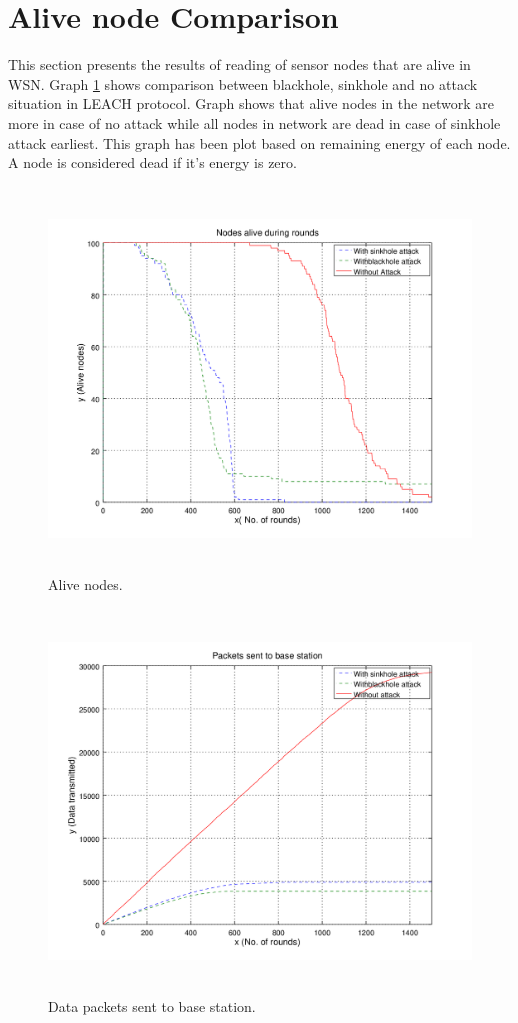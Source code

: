 \section{Alive node Comparison}
This section presents the results of reading of sensor nodes that are alive in WSN. Graph \ref{alive} shows comparison between blackhole, sinkhole and no attack situation in LEACH protocol. Graph shows that alive nodes in the network are more in case of no attack while all nodes in network are dead in case of sinkhole attack earliest. This graph has been plot based on remaining energy of each node. A node is considered dead if it's energy is zero.
    \begin{figure}[tp]
     \centering
     \includegraphics[width=5.5in, height=4in] {Figures/PNG/alive.png}
     \caption{Alive nodes.}
     \label{alive}
    \end{figure}

    \begin{figure}[bp]
     \centering
     \includegraphics[width=5.5in, height=4in] {Figures/PNG/packets.png}
     \caption{Data packets sent to base station.}
     \label{packets}
    \end{figure}
